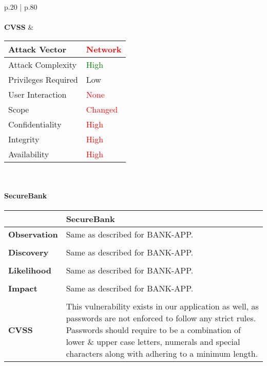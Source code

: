 \begin{longtable*}{p{.20\textwidth} | p{.80\textwidth}}
    \\\\
    \textbf{CVSS} &
      \begin{tabular}{| l | l |}
      \hline
      Attack Vector		& \textcolor{red}{Network}\\
      \hline
      Attack Complexity	& \textcolor{Green}{High} \\
      \hline
      Privileges Required & \textcolor{BurntOrange}{Low} \\
      \hline
      User Interaction	& \textcolor{red}{None} \\
      \hline
      Scope		& \textcolor{red}{Changed} \\
      \hline
      Confidentiality	& \textcolor{red}{High} \\
      \hline
      Integrity		& \textcolor{red}{High} \\
      \hline
      Availability		& \textcolor{red}{High} \\
      \hline
      \end{tabular}
    \\
    \hline
\end{longtable*}
\paragraph{SecureBank} \mbox{}
\begin{longtable*}{p{.20\textwidth} | p{.80\textwidth}}
    \hline
    & \textbf{SecureBank} \\
    \hline
    \textbf{Observation} &
       Same as described for BANK-APP.
    \\\\
    \textbf{Discovery} &
    Same as described for BANK-APP.
    \\\\
    \textbf{Likelihood} &
        Same as described for BANK-APP.
    \\\\
    \textbf{Impact} &
        Same as described for BANK-APP.
    \\\\
    \textbf{CVSS} &
        This vulnerability exists in our application as well, as passwords are not enforced to follow any strict rules. Passwords should require to be a combination of lower \& upper case letters, numerals and special characters along with adhering to a minimum length.
    \\
    \hline
\end{longtable*}
\clearpage